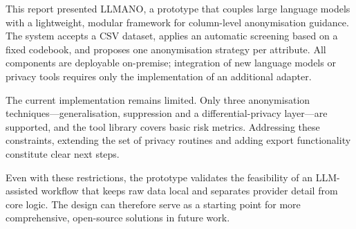 \documentclass{article}
\begin{document}
This report presented LLMANO, a prototype that couples large language models with a lightweight, modular framework for column-level anonymisation guidance.  The system accepts a CSV dataset, applies an automatic screening based on a fixed codebook, and proposes one anonymisation strategy per attribute.  All components are deployable on-premise; integration of new language models or privacy tools requires only the implementation of an additional adapter.

The current implementation remains limited.  Only three anonymisation techniques—generalisation, suppression and a differential-privacy layer—are supported, and the tool library covers basic risk metrics. Addressing these constraints, extending the set of privacy routines and adding export functionality constitute clear next steps.

Even with these restrictions, the prototype validates the feasibility of an LLM-assisted workflow that keeps raw data local and separates provider detail from core logic.  The design can therefore serve as a starting point for more comprehensive, open-source solutions in future work.
\end{document}
